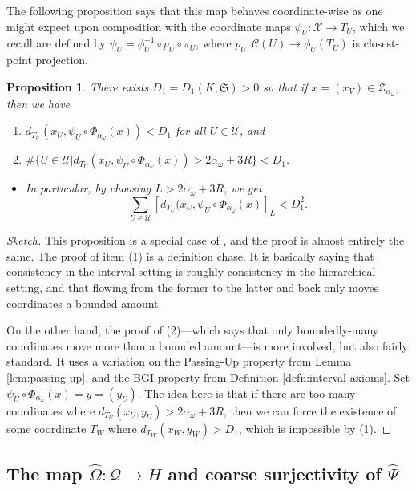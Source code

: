 \documentclass{amsart}
\newtheorem{proposition}[theorem]{Proposition}
\theoremstyle{definition}
\theoremstyle{remark}
\theoremstyle{definition}
\newcommand{\calC}{\mathcal{C}}
\newcommand{\calQ}{\mathcal{Q}}
\newcommand{\calU}{\mathcal{U}}
\newcommand{\calX}{\mathcal{X}}
\newcommand{\calZ}{\mathcal{Z}}
\newcommand{\hO}{\widehat{\Omega}}
\newcommand{\hPsi}{\widehat{\Psi}}
\begin{document}
The following proposition says that this map behaves coordinate-wise as one might expect upon composition with the coordinate maps $\psi_U:\calX \to T_U$, which we recall are defined by $\psi_U = \phi^{-1}_U\circ p_U \circ \pi_U$, where $p_U:\calC(U) \to \phi_U(T_U)$ is closest-point projection.  

\begin{proposition}\label{prop:interval coordinate control}
There exists $D_1 = D_1(K, \mathfrak S)>0$ so that if $x = (x_V) \in \calZ_{\alpha_{\omega}}$, then we have
\begin{enumerate}
\item $d_{T_U}(x_U, \psi_U \circ \Phi_{\alpha_{\omega}}(x))<D_1$ for all $U \in \calU$, and
\item $\#\{U \in \calU| d_{T_U}(x_U, \psi_U \circ \Phi_{\alpha_{\omega}}(x)) > 2\alpha_{\omega} + 3R\} < D_1$.
\end{enumerate}
\begin{itemize}
\item In particular, by choosing $L>2\alpha_{\omega} + 3R$, we get
$$\sum_{U \in \calU} [d_{T_U}(x_U, \psi_U \circ \Phi_{\alpha_{\omega}}(x)]_L < D_1^2.$$
\end{itemize}
\end{proposition}

\begin{proof}[Sketch]
This proposition is a special case of \cite[Proposition 11.4]{Dur_infcube}, and the proof is almost entirely the same.  The proof of item (1) is a definition chase.  It is basically saying that consistency in the interval setting is roughly consistency in the hierarchical setting, and that flowing from the former to the latter and back only moves coordinates a bounded amount.

On the other hand, the proof of (2)---which says that only boundedly-many coordinates move more than a bounded amount---is more involved, but also fairly standard.  It uses a variation on the Passing-Up property from Lemma \ref{lem:passing-up}, and the BGI property from Definition \ref{defn:interval axioms}.  Set $\psi_U \circ \Phi_{\alpha_{\omega}}(x) = y = (y_U)$.  The idea here is that if there are too many coordinates where $d_{T_U}(x_U, y_U) > 2\alpha_{\omega} + 3R$, then we can force the existence of some coordinate $T_W$ where $d_{T_W}(x_W,y_W)>D_1$, which is impossible by (1).
\end{proof}

\subsection{The map $\hO:\calQ \to H$ and coarse surjectivity of $\hPsi$}
\end{document}
